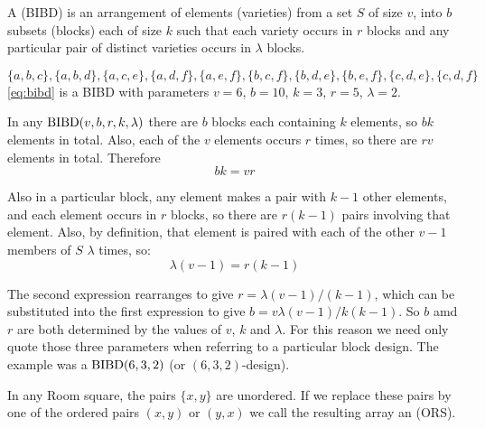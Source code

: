 A  (BIBD) is an arrangement of elements (varieties) from a set $S$ of size $v$, into $b$ subsets (blocks) each of size $k$ such that each variety occurs in $r$ blocks and any particular pair of distinct varieties occurs in $\lambda$ blocks.

\begin{example}
\begin{equation}
\label{eq:bibd}
\{a,b,c\},\{a,b,d\},\{a,c,e\},\{a,d,f\},\{a,e,f\},\{b,c,f\},\{b,d,e\},\{b,e,f\},\{c,d,e\},\{c,d,f\}
\end{equation}
\eqref{eq:bibd} is a BIBD with parameters $v = 6$, $b = 10$, $k = 3$,
$r = 5$, $\lambda = 2$.
\end{example}

In any $\operatorname{BIBD}(v, b, r, k, \lambda)$ there are $b$ blocks each containing $k$ elements, so $bk$ elements in total.
Also, each of the $v$ elements occurs $r$ times, so there are $rv$ elements in total.
Therefore
\begin{equation}
bk = vr
\end{equation}

Also in a particular block, any element makes a pair with $k - 1$ other elements, and each element occurs in $r$ blocks, so there are $r(k - 1)$ pairs involving that element.
Also, by definition, that element is paired with each of the other $v - 1$ members of $S$ $\lambda$ times, so:
\begin{equation}
\lambda (v - 1) = r(k - 1)
\end{equation}

The second expression rearranges to give $r = \lambda (v - 1)/(k - 1)$, which can be substituted into the first expression to give $b = v\lambda (v - 1)/k(k - 1)$.
So $b$ amd $r$ are both determined by the values of $v$, $k$ and $\lambda$.
For this reason we need only quote those three parameters when referring to a particular block design.
The example was a $\operatorname{BIBD}(6, 3, 2)$ (or $(6, 3, 2)$-design).

In any Room square, the pairs $\{x, y\}$ are unordered.
If we replace these pairs by one of the ordered pairs $(x, y)$ or $(y, x)$ we call the resulting array an  (ORS).

